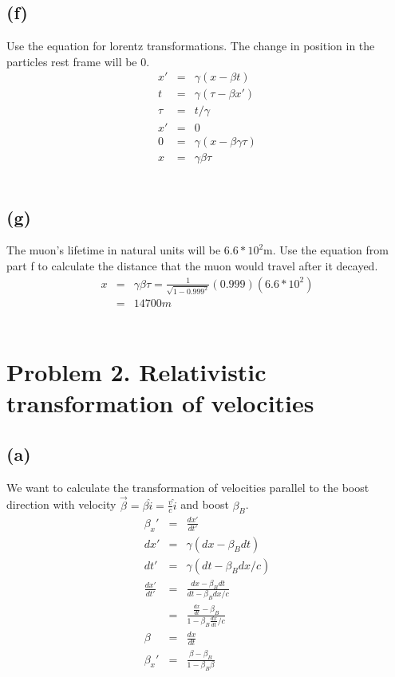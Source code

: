 \documentclass[11pt]{amsart}
\begin{document}
\subsection*{(f)} Use the equation for lorentz transformations. The change in position in the particles rest frame will be 0. \\
\begin{eqnarray*} 
x' &=& \gamma(x-\beta{t}) \\
t &=& \gamma(\tau-\beta{x'}) \\
\tau &=& t/\gamma \\
x' &=& 0 \\
0 &=& \gamma(x-\beta{\gamma\tau}) \\
x &=& \gamma\beta\tau 
\end{eqnarray*} \\
\subsection*{(g)} The muon's lifetime in natural units will be $6.6*10^{2}$m. Use the equation from part f to calculate the distance that the muon would travel after it decayed. \\
\begin{eqnarray*} 
x &=& \gamma\beta\tau = \frac{1}{\sqrt{1-0.999^{2}}}(0.999)(6.6*10^{2}) \\
&=& 14700m 
\end{eqnarray*} \\

\section{Problem 2. Relativistic transformation of velocities}
\subsection*{(a)} We want to calculate the transformation of velocities parallel to the boost direction with velocity  $\vec{\beta}=\beta\hat{i}=\frac{v}{c}\hat{i}$ and boost $\beta_{B}$.\\
\begin{eqnarray*}
\beta_{x}' &=& \frac{dx'}{dt'} \\
dx' &=& \gamma(dx-\beta_{B}dt) \\
dt' &=& \gamma(dt-\beta_{B}dx/c) \\
\frac{dx'}{dt'} &=& \frac{dx-\beta_{B}dt}{dt-\beta_{B}dx/c} \\
&=& \frac{\frac{dx}{dt}-\beta_{B}}{1-\beta_{B}\frac{dx}{dt}/c} \\
\beta &=& \frac{dx}{dt} \\
\beta_{x}' &=& \frac{\beta-\beta_{B}}{1-\beta_{B}\beta} 
\end{eqnarray*} \\
\end{document}
